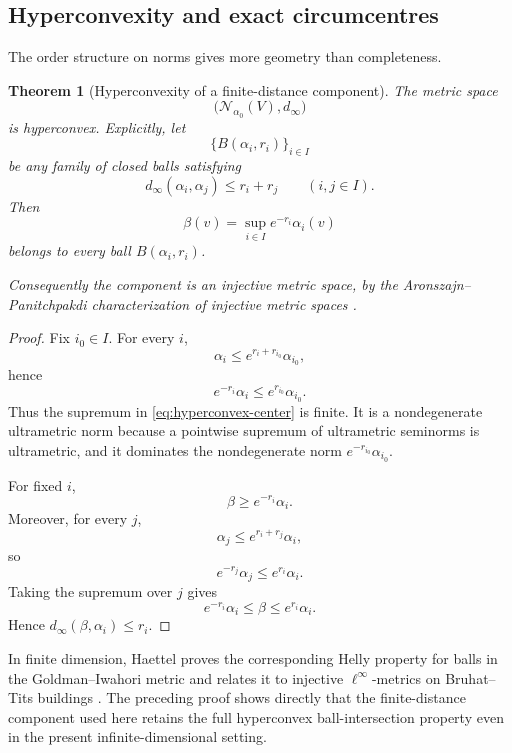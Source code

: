 \documentclass[12pt]{article}
\newtheorem{theorem}{Theorem}[section]
\theoremstyle{definition}
\theoremstyle{remark}
\newcommand{\Norm}{\mathscr N}
\newcommand{\dinf}{d_{\infty}}
\begin{document}
\subsection{Hyperconvexity and exact circumcentres}
\label{subsec:hyperconvex-norm-space}

The order structure on norms gives more geometry than completeness.

\begin{theorem}[Hyperconvexity of a finite-distance component]
\label{thm:hyperconvex-component}
The metric space
\[
 \bigl(\Norm_{\alpha_0}(V),\dinf\bigr)
\]
is hyperconvex.  Explicitly, let
\[
 \{B(\alpha_i,r_i)\}_{i\in I}
\]
be any family of closed balls satisfying
\[
 \dinf(\alpha_i,\alpha_j)\leq r_i+r_j
 \qquad(i,j\in I).
\]
Then
\begin{equation}\label{eq:hyperconvex-center}
 \beta(v)
 =
 \sup_{i\in I}e^{-r_i}\alpha_i(v)
\end{equation}
belongs to every ball \(B(\alpha_i,r_i)\).

Consequently the component is an injective metric space, by the
Aronszajn--Panitchpakdi characterization of injective metric spaces
\cite{AronszajnPanitchpakdi1956}.
\end{theorem}

\begin{proof}
Fix \(i_0\in I\).  For every \(i\),
\[
 \alpha_i\leq e^{r_i+r_{i_0}}\alpha_{i_0},
\]
hence
\[
 e^{-r_i}\alpha_i\leq e^{r_{i_0}}\alpha_{i_0}.
\]
Thus the supremum in \eqref{eq:hyperconvex-center} is finite.  It is a
nondegenerate ultrametric norm because a pointwise supremum of ultrametric
seminorms is ultrametric, and it dominates the nondegenerate norm
\(e^{-r_{i_0}}\alpha_{i_0}\).

For fixed \(i\),
\[
 \beta\geq e^{-r_i}\alpha_i.
\]
Moreover, for every \(j\),
\[
 \alpha_j\leq e^{r_i+r_j}\alpha_i,
\]
so
\[
 e^{-r_j}\alpha_j\leq e^{r_i}\alpha_i.
\]
Taking the supremum over \(j\) gives
\[
 e^{-r_i}\alpha_i\leq\beta\leq e^{r_i}\alpha_i.
\]
Hence \(\dinf(\beta,\alpha_i)\leq r_i\).
\end{proof}

In finite dimension, Haettel proves the corresponding Helly property for
balls in the Goldman--Iwahori metric and relates it to injective
\(\ell^\infty\)-metrics on Bruhat--Tits buildings
\cite{Haettel2022}.  The preceding proof shows directly that the
finite-distance component used here retains the full hyperconvex
ball-intersection property even in the present infinite-dimensional setting.
\end{document}
